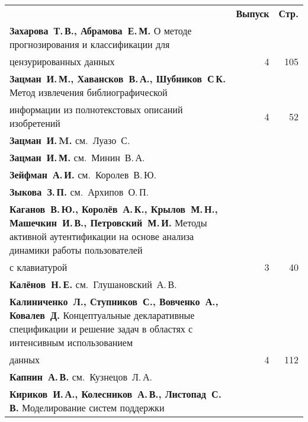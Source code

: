 {\tabcolsep=3pt
\begin{tabular}{p{388pt}rr}
&\textbf{Выпуск} & \textbf{Стр.}\\[3pt]
\textbf{Захарова~Т.\,В., Абрамова~Е.\,М.}
О методе прогнозирования и классификации для\linebreak
\vspace*{-12pt}\\
\hspace*{23pt}цензурированных данных\dotfill&4&105\\
\textbf{Зацман~И.\,М., Хавансков~В.\,А., Шубников~С\,К.}
Метод извлечения библиографической\linebreak
\vspace*{-12pt}\\
\hspace*{23pt}информации из полнотекстовых описаний изобретений\dotfill&4&52\\
\textbf{Зацман~И.\,M.} см.~Луазо~С.&&\\
\textbf{Зацман~И.\,М.} см.~Минин~В.\,А.&&\\
\textbf{Зейфман~А.\,И.} см.~Королев~В.\,Ю.&&\\
\textbf{Зыкова~З.\,П.} см.~Архипов~О.\,П.&&\\
\hangindent=23pt\noindent\textbf{Каганов~В.\,Ю., Королёв~А.\,К., Крылов~М.\,Н.,
 Машечкин~И.\,В., Петровский~М.\,И.}
Методы активной аутентификации на основе анализа динамики работы пользователей\linebreak
\vspace*{-12pt}\\
\hspace*{23pt}с клавиатурой\dotfill&3& 40\\
\textbf{Калёнов~Н.\,Е.} см.~Глушановский~А.\,В.&&\\
\hangindent=23pt\noindent\textbf{Калиниченко~Л., Ступников~С., Вовченко~А., Ковалев~Д.}
Концептуальные декларативные спецификации и решение задач в областях с интенсивным
использованием\linebreak
\vspace*{-12pt}\\
\hspace*{23pt}данных\dotfill&4&112\\
\textbf{Капнин~А.\,В.} см.~Кузнецов~Л.\,А.&&\\
\textbf{Кириков~И.\,А., Колесников~А.\,В., Листопад~С.\,В.}
Моделирование систем поддержки\linebreak
\vspace*{-12pt}\\

\end{tabular}}
